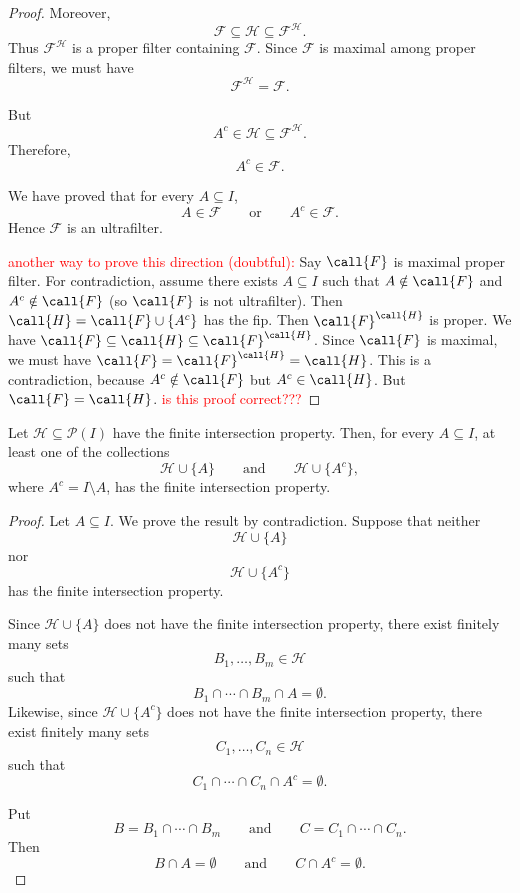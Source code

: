 {\begin{proof}
Moreover,
\[
\mathcal{F}\subseteq\mathcal{H}
\subseteq\mathcal{F}^{\mathcal{H}}.
\]
Thus \(\mathcal{F}^{\mathcal{H}}\) is a proper filter containing
\(\mathcal{F}\). Since \(\mathcal{F}\) is maximal among proper filters, we
must have
\[
\mathcal{F}^{\mathcal{H}}=\mathcal{F}.
\]

But
\[
A^c\in\mathcal{H}\subseteq\mathcal{F}^{\mathcal{H}}.
\]
Therefore,
\[
A^c\in\mathcal{F}.
\]

We have proved that for every \(A\subseteq I\),
\[
A\in\mathcal{F}
\qquad\text{or}\qquad
A^c\in\mathcal{F}.
\]
Hence \(\mathcal{F}\) is an ultrafilter.

\textcolor{red}{another way to prove this direction (doubtful):}
Say $\call{F}$ is maximal proper filter. For contradiction, assume there exists $A \subseteq I$ such that $A \notin \call{F}$ and $A^c \notin \call{F}$ (so $\call{F}$ is not ultrafilter). Then $\call{H}=\call{F} \cup \{A^c\}$ has the fip. Then $\call{F}^\call{H}$ is proper. We have $\call{F} \subseteq \call{H} \subseteq \call{F}^\call{H}$. Since $\call{F}$ is maximal, we must have $\call{F}=\call{F}^\call{H}=\call{H}$. This is a contradiction, because $A^c \notin \call{F}$ but $A^c \in \call{H}$. But $\call{F}=\call{H}$. \textcolor{red}{is this proof correct???}
\end{proof}

\begin{prop}
Let \(\mathcal{H} \subseteq \mathcal{P}(I)\) have the finite intersection
property. Then, for every \(A \subseteq I\), at least one of the collections
\[
\mathcal{H} \cup \{A\}
\qquad\text{and}\qquad
\mathcal{H} \cup \{A^c\},
\]
where \(A^c=I\setminus A\), has the finite intersection property.
\end{prop}

\begin{proof}
Let \(A\subseteq I\). We prove the result by contradiction. Suppose that
neither
\[
\mathcal{H}\cup\{A\}
\]
nor
\[
\mathcal{H}\cup\{A^c\}
\]
has the finite intersection property.

Since \(\mathcal{H}\cup\{A\}\) does not have the finite intersection
property, there exist finitely many sets
\[
B_1,\ldots,B_m\in\mathcal{H}
\]
such that
\[
B_1\cap\cdots\cap B_m\cap A=\emptyset.
\]
Likewise, since \(\mathcal{H}\cup\{A^c\}\) does not have the finite
intersection property, there exist finitely many sets
\[
C_1,\ldots,C_n\in\mathcal{H}
\]
such that
\[
C_1\cap\cdots\cap C_n\cap A^c=\emptyset.
\]

Put
\[
B=B_1\cap\cdots\cap B_m
\qquad\text{and}\qquad
C=C_1\cap\cdots\cap C_n.
\]
Then
\[
B\cap A=\emptyset
\qquad\text{and}\qquad
C\cap A^c=\emptyset.
\]


\end{proof}}
